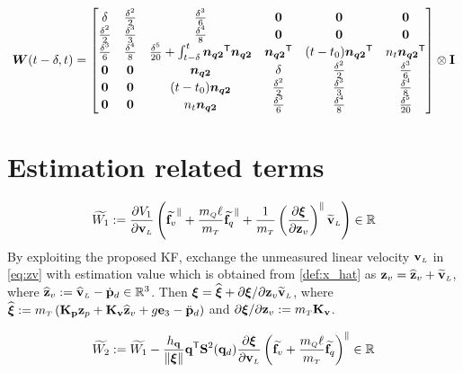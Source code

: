 \documentclass[journal,onecolumn]{IEEEtran}
\begin{document}
	\begin{align}
		\boldsymbol{W}(t-\delta,t)=
		\begin{bmatrix}
			\delta  & \frac{\delta^2}{2} & \frac{\delta^3}{6}  & {\bf 0} & {\bf 0} & {\bf 0} \\
			\frac{\delta^2}{2} & \frac{\delta^3}{3} & \frac{\delta^4}{8} & {\bf 0} & {\bf 0} & {\bf 0} \\
			\frac{\delta^3}{6} & \frac{\delta^4}{8} & \frac{\delta^5}{20}+\int_{t-\delta}^{t}\boldsymbol{n_{q2}}^\mathsf{T}\boldsymbol{n_{q2}} & \boldsymbol{n_{q2}}^\mathsf{T} & (t-t_0)\boldsymbol{n_{q2}}^\mathsf{T} & n_t\boldsymbol{n_{q2}}^\mathsf{T}\\
			{\bf 0} & {\bf 0} & \boldsymbol{n_{q2}}  & \delta  & \frac{\delta^2}{2} & \frac{\delta^3}{6}\\
			{\bf 0} & {\bf 0} & (t-t_0)\boldsymbol{n_{q2}} & \frac{\delta^2}{2} & \frac{\delta^3}{3} & \frac{\delta^4}{8}\\
			{\bf 0} & {\bf 0} & n_t\boldsymbol{n_{q2}} & \frac{\delta^3}{6} & \frac{\delta^4}{8} & \frac{\delta^5}{20}
		\end{bmatrix}\otimes {\bf I}
		\label{eq:W_t_delta}
	\end{align}


\section{Estimation related terms}

\begin{equation}
	\widetilde{W_1}:=\frac{\partial V_1}{\partial \vL}\LP\widetilde{\f_v}^{\|} + \frac{\mQ\ellp}{\mT}\widetilde{\f_q}^{\|} + \frac{1}{\mT}\LP\frac{\partial\Xiq}{\partial\zv}\RP^{\|}\vLtilde\RP \in \mathbb{R}
\end{equation}
By exploiting the proposed KF, exchange the unmeasured linear velocity $\vL$ in \eqref{eq:zv} with estimation value which is obtained from \eqref{def:x_hat} as
$\zv = \zvhat + \vLtilde$,
%
where $\zvhat:=\vLhat - \pLddot\in\mathbb{R}^3$. 
Then
%
$ \Xiq = \widehat{\Xiq} + \partial \Xiq/\partial \zv\vLtilde$,
%
where $\widehat{\Xiq}:=\mT\LP{\bf K_p}\zp + {\bf K_v} \zvhat + g\ez - \pLdddot\RP$ and $\partial \Xiq/\partial \zv:= \mT{\bf K_v}$.


\begin{align}
	\widetilde{W_2} := \widetilde{W_1} - \frac{h_\v{q}}{\|\Xiq\|}\dir[T]\Skew[2]{\dird}  \frac{\partial \Xiq}{\partial \vL}\LP\widetilde{\f_v} 
	+ \frac{\mQ\ellp}{\mT}\widetilde{\f_q} \RP^{\|}\in\mathbb{R}
\end{align}
\end{document}
